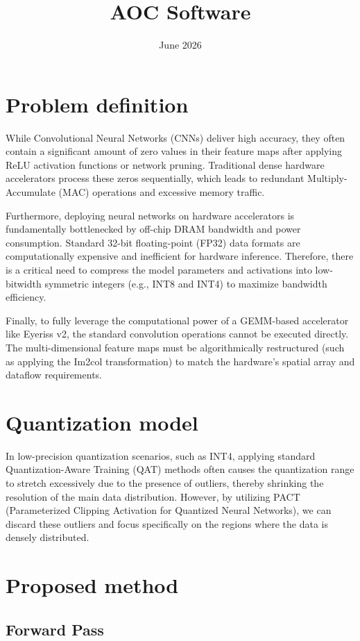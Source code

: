 \documentclass{article}
\title{AOC Software}
\date{June 2026}
\begin{document}
\renewcommand{\thesection}{\Roman{section}}

\section{Problem definition}

While Convolutional Neural Networks (CNNs) deliver high accuracy, they often contain a significant amount of zero values in their feature maps after applying ReLU activation functions or network pruning. Traditional dense hardware accelerators process these zeros sequentially, which leads to redundant Multiply-Accumulate (MAC) operations and excessive memory traffic.

Furthermore, deploying neural networks on hardware accelerators is fundamentally bottlenecked by off-chip DRAM bandwidth and power consumption. Standard 32-bit floating-point (FP32) data formats are computationally expensive and inefficient for hardware inference. Therefore, there is a critical need to compress the model parameters and activations into low-bitwidth symmetric integers (e.g., INT8 and INT4) to maximize bandwidth efficiency.

Finally, to fully leverage the computational power of a GEMM-based accelerator like Eyeriss v2, the standard convolution operations cannot be executed directly. The multi-dimensional feature maps must be algorithmically restructured (such as applying the Im2col transformation) to match the hardware's spatial array and dataflow requirements.

\section{Quantization model}

In low-precision quantization scenarios, such as INT4, applying standard Quantization-Aware Training (QAT) methods often causes the quantization range to stretch excessively due to the presence of outliers, thereby shrinking the resolution of the main data distribution. However, by utilizing PACT (Parameterized Clipping Activation for Quantized Neural Networks), we can discard these outliers and focus specifically on the regions where the data is densely distributed.

\section{Proposed method}

\subsection{Forward Pass}
\end{document}

